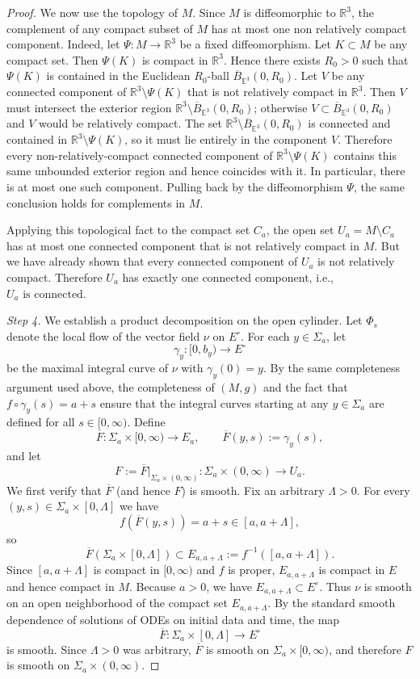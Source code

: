 \documentclass[12pt,oneside,a4paper]{article}
\theoremstyle{mytheorem}
\theoremstyle{remark}
\begin{document}
\begin{proof}
We now use the topology of $M$. Since $M$ is diffeomorphic to $\mathbb{R}^3$, the complement of any compact subset of $M$ has at most one non relatively compact component. Indeed, let $\Psi:M\to\mathbb{R}^3$ be a fixed diffeomorphism. Let $K\subset M$ be any compact set. Then \(\Psi(K)\) is compact in \(\mathbb{R}^3\). Hence there exists \(R_0 > 0\) such that \(\Psi(K)\) is contained in the Euclidean \(R_0\)-ball \(\overline{B}_{\mathbb{E}^3}(0,R_0)\).
Let $V$ be any connected component of $\mathbb{R}^3\setminus\Psi(K)$ that is not relatively compact in $\mathbb{R}^3$. Then $V$ must intersect the exterior region $\mathbb{R}^3\setminus\overline{B}_{\mathbb{E}^3}(0,R_0)$; otherwise $V\subset\overline{B}_{\mathbb{E}^3}(0,R_0)$ and $V$ would be relatively compact. The set $\mathbb{R}^3\setminus\overline{B}_{\mathbb{E}^3}(0,R_0)$ is connected and contained in $\mathbb{R}^3\setminus\Psi(K)$, so it must lie entirely in the component $V$. Therefore every non-relatively-compact connected component of $\mathbb{R}^3\setminus\Psi(K)$ contains this same unbounded exterior region and hence coincides with it. In particular, there is at most one such component. Pulling back by the diffeomorphism $\Psi$, the same conclusion holds for complements in $M$.

Applying this topological fact to the compact set $C_a$, the open set $U_a=M\setminus C_a$ has at most one connected component that is not relatively compact in $M$. But we have already shown that every connected component of $U_a$ is not relatively compact. Therefore $U_a$ has exactly one connected component, i.e., $U_a\text{ is connected.}$

\textit{Step 4. } We establish a product decomposition on the open cylinder.
Let $\Phi_s$ denote the local flow of the vector field $\nu$ on $E^\circ$. For each $y\in\Sigma_a$, let
\[
\gamma_y:[0,b_y)\to E^\circ
\]
be the maximal integral curve of $\nu$ with $\gamma_y(0)=y$. By the same completeness argument used above, the completeness of $(M, g)$ and the fact that $f \circ \gamma_y(s) = a + s$ ensure that the integral curves starting at any $y \in \Sigma_a$ are defined for all $s \in [0, \infty)$. Define
\[
\overline{F}:\Sigma_a\times[0,\infty)\to E_a,\qquad\overline{F}(y,s):=\gamma_y(s),
\]
and let
\[
F:=\overline{F}|_{\Sigma_a\times(0,\infty)}:\Sigma_a\times(0,\infty)\to U_a.
\]
We first verify that $\overline{F}$ (and hence $F$) is smooth. Fix an arbitrary $\Lambda>0$. For every $(y,s)\in\Sigma_a\times[0,\Lambda]$ we have
\[
f(\overline{F}(y,s))=a+s\in[a,a+\Lambda],
\]
so
\[
\overline{F}(\Sigma_a\times[0,\Lambda])\subset E_{a,a+\Lambda}:=f^{-1}([a,a+\Lambda]).
\]
Since $[a,a+\Lambda]$ is compact in $[0,\infty)$ and $f$ is proper, $E_{a,a+\Lambda}$ is compact in $E$ and hence compact in $M$. Because $a>0$, we have $E_{a,a+\Lambda}\subset E^\circ$. Thus $\nu$ is smooth on an open neighborhood of the compact set $E_{a,a+\Lambda}$. By the standard smooth dependence of solutions of ODEs on initial data and time, the map
\[
\overline{F}:\Sigma_a\times[0,\Lambda]\to E^\circ
\]
is smooth. Since $\Lambda>0$ was arbitrary, $\overline{F}$ is smooth on $\Sigma_a\times[0,\infty)$, and therefore $F$ is smooth on $\Sigma_a\times(0,\infty)$.


\end{proof}
\end{document}
